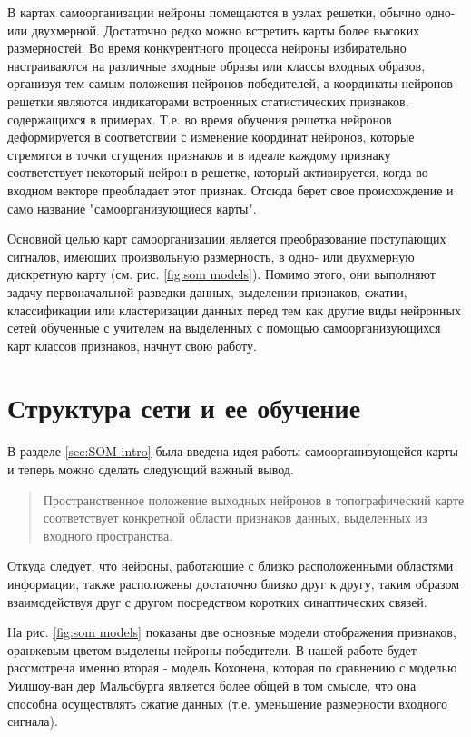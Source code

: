 \documentclass[a4paper,12pt]{report}
\begin{document}
В картах самоорганизации нейроны помещаются в узлах решетки, обычно
одно- или двухмерной. Достаточно редко можно встретить карты более
высоких размерностей. Во время конкурентного процесса нейроны
избирательно настраиваются на различные входные образы или классы
входных образов, организуя тем самым положения нейронов-победителей, а
координаты нейронов решетки являются индикаторами встроенных
статистических признаков, содержащихся в примерах. Т.е. во время
обучения решетка нейронов деформируется в соответствии с изменение
координат нейронов, которые стремятся в точки сгущения признаков и в
идеале каждому признаку соответствует некоторый нейрон в решетке,
который активируется, когда во входном векторе преобладает этот
признак. Отсюда берет свое происхождение и само название
"самоорганизующиеся карты".

Основной целью карт самоорганизации является преобразование
поступающих сигналов, имеющих произвольную размерность, в одно- или
двухмерную дискретную карту (см. рис. \ref{fig:som models}). Помимо
этого, они выполняют
задачу первоначальной разведки данных, выделении признаков, сжатии,
классификации или кластеризации данных перед тем как другие виды
нейронных сетей обученные с учителем на выделенных с помощью
самоорганизующихся карт классов признаков, начнут свою работу.

\section{Структура сети и ее обучение}
В разделе \ref{sec:SOM intro} была введена идея работы
самоорганизующейся карты и теперь можно сделать следующий важный
вывод.
\begin{quote}
    Пространственное положение выходных нейронов в топографический
    карте соответствует конкретной области признаков данных,
    выделенных из входного пространства.
\end{quote}
Откуда следует, что нейроны, работающие с близко расположенными
областями информации, также расположены достаточно близко друг к
другу, таким образом взаимодействуя друг с другом посредством коротких
синаптических связей.

На рис. \ref{fig:som models} показаны две основные модели отображения
признаков, оранжевым цветом выделены нейроны-победители. В
нашей работе будет рассмотрена именно вторая - модель Кохонена,
которая по сравнению с моделью Уилшоу-ван дер Мальсбурга является
более общей в том смысле, что она способна осуществлять сжатие данных
(т.е. уменьшение размерности входного сигнала).
\end{document}
